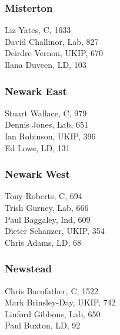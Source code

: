 \documentclass[a4paper,openany,10pt]{book}
\begin{document}
\subsubsection*{Misterton}



Liz Yates, C, 1633\\
David Challinor, Lab, 827\\
Deirdre Vernon, UKIP, 670\\
Ilana Duveen, LD, 103\\


\subsubsection*{Newark East}



Stuart Wallace, C, 979\\
Dennis Jones, Lab, 651\\
Ian Robinson, UKIP, 396\\
Ed Lowe, LD, 131\\


\subsubsection*{Newark West}



Tony Roberts, C, 694\\
Trish Gurney, Lab, 666\\
Paul Baggaley, Ind, 609\\
Dieter Schanzer, UKIP, 354\\
Chris Adams, LD, 68\\


\subsubsection*{Newstead}



Chris Barnfather, C, 1522\\
Mark Brinsley-Day, UKIP, 742\\
Linford Gibbons, Lab, 650\\
Paul Buxton, LD, 92\\
\end{document}
